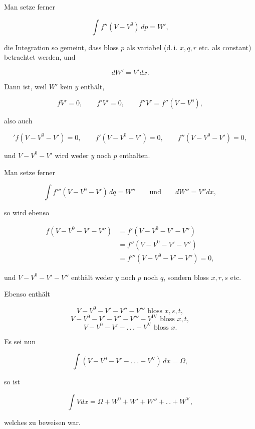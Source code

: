 Man setze ferner

\[
\int f''(V - V^0)\,dp = W',
\]

\noindent die Integration so gemeint, dass bloss $p$ als variabel (d.\,i. $x, q, r$ etc. als constant) betrachtet werden, und

\[
dW' = V'dx.
\]

\noindent Dann ist, weil $W'$ kein $y$ enthält,

\[
fV' = 0, \qquad f'V' = 0, \qquad f''V' = f''(V - V^0),
\]

\noindent also auch

\[
{}'f(V - V^0 - V') = 0, \qquad f'(V - V^0 - V') = 0, \qquad f''(V - V^0 - V') = 0,
\]

\noindent und $V - V^0 - V'$ wird weder $y$ noch $p$ enthalten.

Man setze ferner

\[
\int f'''(V - V^0 - V')\,dq = W'' \qquad \text{und} \qquad dW'' = V''dx,
\]

\noindent so wird ebenso

\[
\begin{aligned}f(V - V^0 - V' - V'') &={} f'(V - V^0 - V' - V'')\\ &={} f''(V - V^0 - V' - V'')\\ &={} f'''(V - V^0 - V' - V'') = 0,\end{aligned}
\]

\noindent und $V - V^0 - V' - V''$ enthält weder $y$ noch $p$ noch $q$, sondern bloss $x, r, s$ etc.

Ebenso enthält

\[
V - V^0 - V' - V'' - V''' \text{ bloss } x, s, t,
\]
\[
V - V^0 - V' - V'' - V''' - V^{\mathrm{IV}} \text{ bloss } x, t,
\]
\[
V - V^0 - V' - .\,.\,. - V^{\mathrm{V}} \text{ bloss } x.
\]

\noindent Es sei nun

\[
\int (V - V^0 - V' - .\,.\,. - V^{\mathrm{V}})\,dx = \Omega,
\]

\noindent so ist

\[
\int V dx = \Omega + W^0 + W' + W'' + .\,. + W^{\mathrm{V}},
\]

\noindent welches zu beweisen war.


